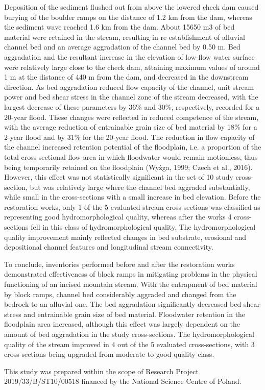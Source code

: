 {	Deposition of the sediment flushed out from above the lowered check dam caused burying of the boulder ramps on the distance of 1.2 km from the dam, whereas the sediment wave reached 1.6 km from the dam. About 15650 m3 of bed material were retained in the stream, resulting in re-establishment of alluvial channel bed and an average aggradation of the channel bed by 0.50 m. Bed aggradation and the resultant increase in the elevation of low-flow water surface were relatively large close to the check dam, attaining maximum values of around 1 m at the distance of 440 m from the dam, and decreased in the downstream direction. As bed aggradation reduced flow capacity of the channel, unit stream power and bed shear stress in the channel zone of the stream decreased, with the largest decrease of these parameters by 36\% and 30\%, respectively, recorded for a 20-year flood. These changes were reflected in reduced competence of the stream, with the average reduction of entrainable grain size of bed material by 18\% for a 2-year flood and by 31\% for the 20-year flood. The reduction in flow capacity of the channel increased retention potential of the floodplain, i.e. a proportion of the total cross-sectional flow area in which floodwater would remain motionless, thus being temporarily retained on the floodplain (Wyżga, 1999; Czech et al., 2016). However, this effect was not statistically significant in the set of 10 study cross-section, but was relatively large where the channel bed aggraded substantially, while small in the cross-sections with a small increase in bed elevation. Before the restoration works, only 1 of the 5 evaluated stream cross-sections was classified as representing good hydromorphological quality, whereas after the works 4 cross-sections fell in this class of hydromorphological quality. The hydromorphological quality improvement mainly reflected changes in bed substrate, erosional and depositional channel features and longitudinal stream connectivity. 
	
	To conclude, inventories performed before and after the restoration works demonstrated effectiveness of block ramps in mitigating problems in the physical functioning of an incised mountain stream. With the entrapment of bed material by block ramps, channel bed considerably aggraded and changed from the bedrock to an alluvial one. The bed aggradation significantly decreased bed shear stress and entrainable grain size of bed material. Floodwater retention in the floodplain area increased, although this effect was largely dependent on the amount of bed aggradation in the study cross-sections. The hydromorphological quality of the stream improved in 4 out of the 5 evaluated cross-sections, with 3 cross-sections being upgraded from moderate to good quality class. 
	
	This study was prepared within the scope of Research Project 2019/33/B/ST10/00518 financed by the National Science Centre of Poland.
}%
